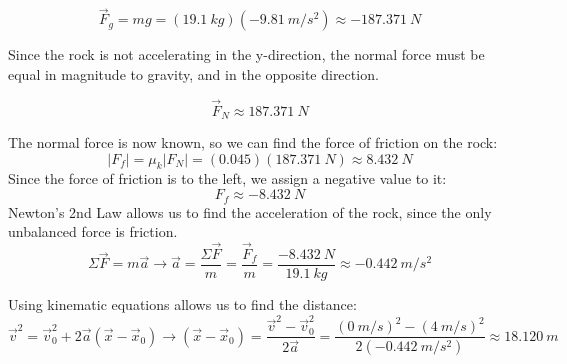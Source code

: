 \begin{mdframed}[backgroundcolor=blue!10!white]
			\begin{equation*}
			\vec{F}_g = m g = (\SI{19.1}{kg})(\SI{-9.81}{m/s^2}) \approx \SI{-187.371}{N}
			\end{equation*}
		
			Since the rock is not accelerating in the y-direction, the normal force must be equal in magnitude to gravity, and in the opposite direction.
			
			\begin{equation*}
			\vec{F}_N \approx \SI{187.371}{N}
			\end{equation*}
			
			The normal force is now known, so we can find the force of friction on the rock:
			\begin{equation*}
			|F_f| = \mu_k |F_N|   = (0.045)( \SI{187.371}{N}) \approx \SI{8.432}{N} 
			\end{equation*}
			Since the force of friction is to the left, we assign a negative value to it:
				\begin{equation*}
			F_f \approx \SI{-8.432}{N} 
			\end{equation*}
			Newton's 2nd Law allows us to find the acceleration of the rock, since the only unbalanced force is friction.
			\begin{equation*}
			\Sigma \vec{F} = m \vec{a} \longrightarrow \vec{a} = \frac{\Sigma \vec{F}}{m} = \frac{\vec{F}_f}{m} =  \frac{\SI{-8.432}{N}}{\SI{19.1}{kg}} \approx \SI{-0.442}{m/s^2}
			\end{equation*}
			
			Using kinematic equations allows us to find the distance:
			\begin{equation*}
			\vec{v}^2 = \vec{v}_0^2 + 2 \vec{a}(\vec{x}-\vec{x}_0) \longrightarrow  (\vec{x}-\vec{x}_0) = \frac{\vec{v}^2 - \vec{v}_0^2}{2 \vec{a}} = \frac{(\SI{0}{m/s})^2 - (\SI{4}{m/s})^2}{2 (\SI{-0.442}{m/s^2})} \approx \SI{18.120}{m}
			\end{equation*}
			
			
		\end{mdframed}	
	
	
		\newpage
		
